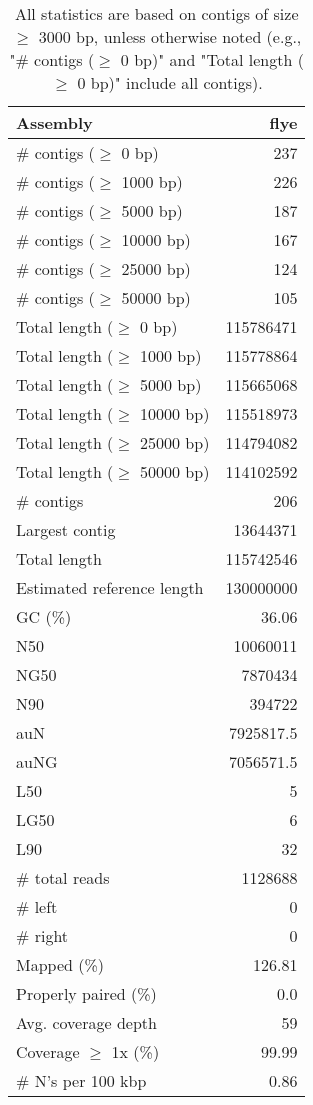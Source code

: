 \documentclass[12pt,a4paper]{article}
\begin{document}
\begin{table}[ht]
\begin{center}
\caption{All statistics are based on contigs of size $\geq$ 3000 bp, unless otherwise noted (e.g., "\# contigs ($\geq$ 0 bp)" and "Total length ($\geq$ 0 bp)" include all contigs).}
\begin{tabular}{|l*{1}{|r}|}
\hline
Assembly & flye \\ \hline
\# contigs ($\geq$ 0 bp) & 237 \\ \hline
\# contigs ($\geq$ 1000 bp) & 226 \\ \hline
\# contigs ($\geq$ 5000 bp) & 187 \\ \hline
\# contigs ($\geq$ 10000 bp) & 167 \\ \hline
\# contigs ($\geq$ 25000 bp) & 124 \\ \hline
\# contigs ($\geq$ 50000 bp) & 105 \\ \hline
Total length ($\geq$ 0 bp) & 115786471 \\ \hline
Total length ($\geq$ 1000 bp) & 115778864 \\ \hline
Total length ($\geq$ 5000 bp) & 115665068 \\ \hline
Total length ($\geq$ 10000 bp) & 115518973 \\ \hline
Total length ($\geq$ 25000 bp) & 114794082 \\ \hline
Total length ($\geq$ 50000 bp) & 114102592 \\ \hline
\# contigs & 206 \\ \hline
Largest contig & 13644371 \\ \hline
Total length & 115742546 \\ \hline
Estimated reference length & 130000000 \\ \hline
GC (\%) & 36.06 \\ \hline
N50 & 10060011 \\ \hline
NG50 & 7870434 \\ \hline
N90 & 394722 \\ \hline
auN & 7925817.5 \\ \hline
auNG & 7056571.5 \\ \hline
L50 & 5 \\ \hline
LG50 & 6 \\ \hline
L90 & 32 \\ \hline
\# total reads & 1128688 \\ \hline
\# left & 0 \\ \hline
\# right & 0 \\ \hline
Mapped (\%) & 126.81 \\ \hline
Properly paired (\%) & 0.0 \\ \hline
Avg. coverage depth & 59 \\ \hline
Coverage $\geq$ 1x (\%) & 99.99 \\ \hline
\# N's per 100 kbp & 0.86 \\ \hline
\end{tabular}
\end{center}
\end{table}
\end{document}
